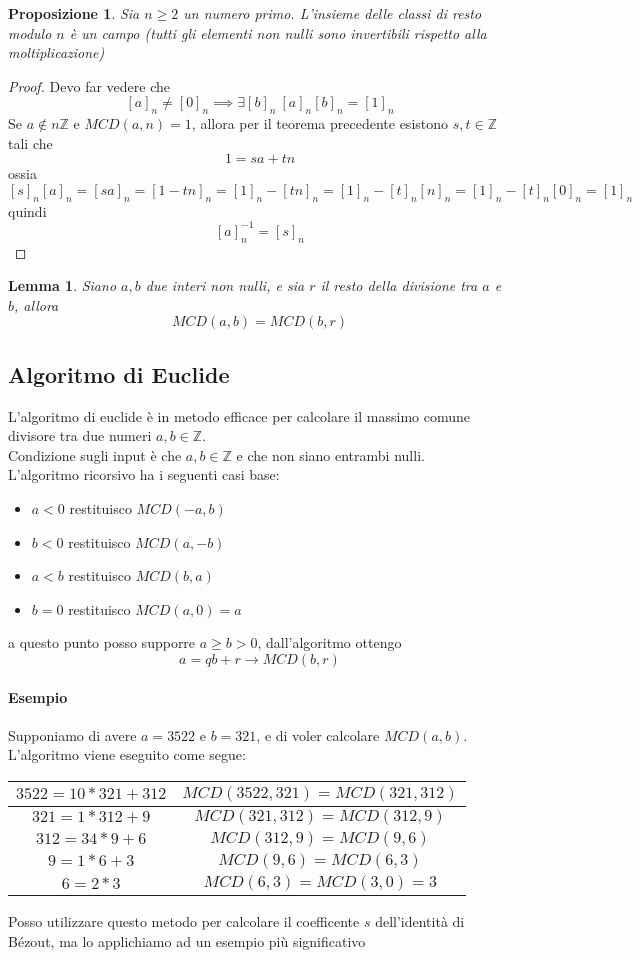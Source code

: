 \documentclass[a4paper]{report}
\newtheorem{proposition}{Proposizione}
\newtheorem{lemma}{Lemma}
\newcommand{\Z}{\ensuremath{\mathbb{Z}}}
\begin{document}
\begin{proposition}
    Sia $n\geq 2$ un numero primo. L'insieme delle classi di resto modulo $n$ è un campo (tutti gli elementi non nulli sono invertibili rispetto alla moltiplicazione)
\end{proposition}
\begin{proof}
    Devo far vedere che
    \[
        [a]_n\neq[0]_n\implies\exists [b]_n\ [a]_n[b]_n=[1]_n
    \]
    Se $a\notin n\Z$ e $MCD(a,n)=1$, allora per il teorema precedente esistono $s,t\in\Z$ tali che
    \[
        1=sa+tn
    \]
    ossia
    \[
        [s]_n[a]_n=[sa]_n=[1-tn]_n=[1]_n-[tn]_n=[1]_n-[t]_n[n]_n=[1]_n-[t]_n[0]_n=[1]_n
    \]
    quindi
    \[
        [a]_n^{-1}=[s]_n
    \]
\end{proof}
\begin{lemma}
    Siano $a,b$ due interi non nulli, e sia $r$ il resto della divisione tra $a$ e $b$, allora
    \[
        MCD(a,b)=MCD(b,r)
    \]
\end{lemma}
\subsection{Algoritmo di Euclide}
L'algoritmo di euclide è in metodo efficace per calcolare il massimo comune divisore tra due numeri $a,b\in\Z$.\\
Condizione sugli input è che $a,b\in\Z$ e che non siano entrambi nulli.\\
L'algoritmo ricorsivo ha i seguenti casi base:
\begin{itemize}
    \item $a<0$ restituisco $MCD(-a,b)$
    \item $b<0$ restituisco $MCD(a,-b)$
    \item $a<b$ restituisco $MCD(b,a)$
    \item $b=0$ restituisco $MCD(a,0)=a$
\end{itemize}
a questo punto posso supporre $a\geq b>0$, dall'algoritmo ottengo
\[
    a=qb+r\longrightarrow MCD(b,r)
\]
\paragraph{Esempio}
Supponiamo di avere $a=3522$ e $b=321$, e di voler calcolare $MCD(a,b)$. L'algoritmo viene eseguito come segue:
\begin{table}[h]
    \center
    \begin{tabular}{|c|c|}
        \hline
        $3522=10*321+312$ & $MCD(3522,321)=MCD(321,312)$ \\ \hline
        $321=1*312+9$     & $MCD(321,312)=MCD(312,9)$    \\ \hline
        $312=34*9+6$      & $MCD(312,9)=MCD(9,6)$        \\ \hline
        $9=1*6+3$         & $MCD(9,6)=MCD(6,3)$          \\ \hline
        $6=2*3$           & $MCD(6,3)=MCD(3,0)=3$        \\ \hline
    \end{tabular}
\end{table}
Posso utilizzare questo metodo per calcolare il coefficente $s$ dell'identità di Bézout, ma lo applichiamo ad un esempio più significativo
\end{document}
